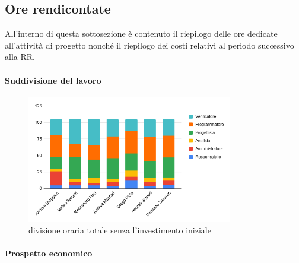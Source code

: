     \subsection{Ore rendicontate}
    All'interno di questa sottosezione è contenuto il riepilogo delle ore dedicate all'attività di progetto nonché il riepilogo dei costi relativi al periodo successivo alla RR.
        \paragraph{Suddivisione del lavoro}
        
        \def\hourlycontent{
            {Andrea Breggion,5,21,4,18,33,24,105},
            {Matteo Falsetti,5,5,5,33,20,37,105},
            {Alessandro Flori,5,4,7,28,22,39,105},
            {Andrea Mascari,4,6,5,31,33,26,105},
            {Diego Piola,12,6,9,26,34,18,105},
            {Andrea Signori,4,6,6,26,36,27,105},
            {Damiano Zanardo,6,6,5,30,33,25,105},
            {Ore totali,41,54,41,192,211,196,735},
        }
        
        \begin{figure}[H]
            \centering
            \includegraphics[width=0.8\textwidth]{source/img/no_investimento_orari.png}
            \caption{divisione oraria totale senza l'investimento iniziale}
        \end{figure}
        \paragraph{Prospetto economico}
        
